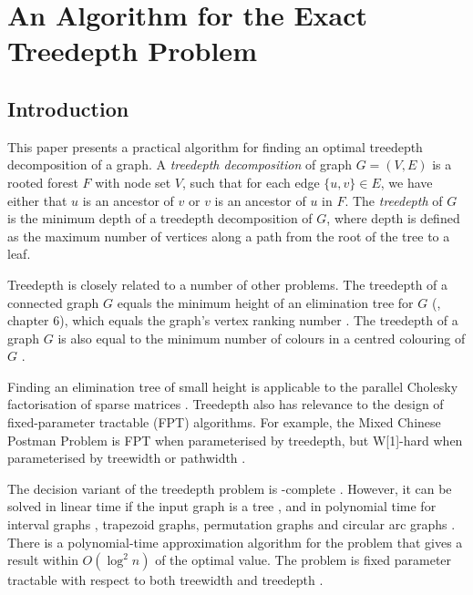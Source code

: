 \chapter{An Algorithm for the Exact Treedepth Problem}

{
    \renewcommand{\arraystretch}{.83}



    \newcommand\Edge{\text{--}}

    \section{Introduction}

    This paper presents a practical algorithm for finding an optimal treedepth decomposition of a graph.
    A \emph{treedepth decomposition} of graph $G=(V,E)$ is a rooted forest $F$ with node set $V$, such that for
    each edge $\{u,v\} \in E$, we have either that $u$ is an ancestor of $v$ or $v$ is an ancestor of $u$
    in $F$.  The \emph{treedepth} of $G$ is the minimum depth of a treedepth decomposition of $G$, where
    depth is defined as the maximum number of vertices along a path from the root of the tree to a leaf.

    Treedepth is closely related to a number of other problems.  The treedepth of a
    connected graph $G$ equals the minimum height of an elimination tree for $G$
    (\cite{DBLP:books/daglib/0030491}, chapter 6), which equals
    the graph's vertex ranking number \cite{DBLP:conf/stacs/DeogunKKM94}.
    The treedepth of a graph $G$ is also equal to the minimum number of
    colours in a centred colouring of $G$ \cite{DBLP:books/daglib/0030491}.

    Finding an elimination tree of small height is applicable to the parallel Cholesky factorisation
    of sparse matrices \cite{zmijewski1986parallel}.
    Treedepth also has relevance to the design of fixed-parameter tractable (FPT) algorithms.  For example,
    the Mixed Chinese Postman Problem is FPT when parameterised by treedepth, but W[1]-hard
    when parameterised by treewidth or pathwidth \cite{DBLP:journals/siamdm/GutinJW16}.

    The decision variant of the treedepth problem is \NP-complete \cite{pothen1988complexity}.  However, it can
    be solved in linear time if the input graph is a tree
    \cite{DBLP:journals/ipl/Schaffer89}, and in polynomial time for interval graphs
    \cite{Aspvall1994}, trapezoid graphs, permutation graphs and circular arc
    graphs \cite{DBLP:journals/dam/DeogunKKM99}.  There is a polynomial-time approximation algorithm
    for the problem that gives a result within $O(\log^2 n)$ of the optimal value.
    The problem is fixed parameter
    tractable with respect to both treewidth and treedepth \cite{DBLP:journals/siamdm/BodlaenderDJKKMT98,DBLP:conf/icalp/ReidlRVS14}.

}
